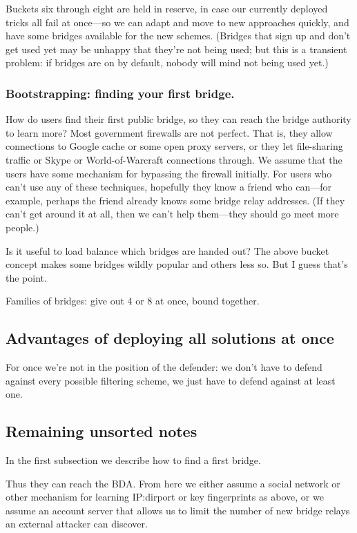 \documentclass{llncs}
\begin{document}
Buckets six through eight are held in reserve, in case our currently
deployed tricks all fail at once---so we can adapt and move to
new approaches quickly, and have some bridges available for the new
schemes. (Bridges that sign up and don't get used yet may be unhappy that
they're not being used; but this is a transient problem: if bridges are
on by default, nobody will mind not being used yet.)

\subsubsection{Bootstrapping: finding your first bridge.}
\label{subsec:first-bridge}
How do users find their first public bridge, so they can reach the
bridge authority to learn more?
Most government firewalls are not perfect. That is, they allow connections to
Google cache or some open proxy servers, or they let file-sharing traffic or
Skype or World-of-Warcraft connections through. We assume that the
users have some mechanism for bypassing the firewall initially.
For users who can't use any of these techniques, hopefully they know
a friend who can---for example, perhaps the friend already knows some
bridge relay addresses.
(If they can't get around it at all, then we can't help them---they
should go meet more people.)

Is it useful to load balance which bridges are handed out? The above
bucket concept makes some bridges wildly popular and others less so.
But I guess that's the point.

Families of bridges: give out 4 or 8 at once, bound together.

\subsection{Advantages of deploying all solutions at once}

For once we're not in the position of the defender: we don't have to
defend against every possible filtering scheme, we just have to defend
against at least one.



\subsection{Remaining unsorted notes}

In the first subsection we describe how to find a first bridge.

Thus they can reach the BDA. From here we either assume a social
network or other mechanism for learning IP:dirport or key fingerprints
as above, or we assume an account server that allows us to limit the
number of new bridge relays an external attacker can discover.
\end{document}
